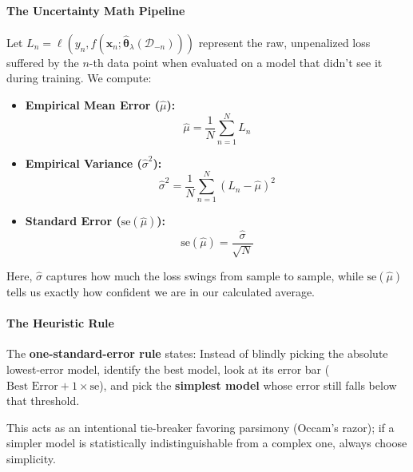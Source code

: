 \documentclass{article}
\begin{document}
\paragraph{The Uncertainty Math Pipeline}
Let $L_n = \ell(y_n, f(\mathbf{x}_n; \hat{\boldsymbol{\theta}}_\lambda(\mathcal{D}_{-n})))$ represent the raw, unpenalized loss suffered by the $n$-th data point when evaluated on a model that didn't see it during training. We compute:
\begin{itemize}
    \item \textbf{Empirical Mean Error ($\hat{\mu}$):}
    \begin{equation}
    \hat{\mu} = \frac{1}{N} \sum_{n=1}^{N} L_n
    \end{equation}
    \item \textbf{Empirical Variance ($\hat{\sigma}^2$):}
    \begin{equation}
    \hat{\sigma}^2 = \frac{1}{N} \sum_{n=1}^{N} (L_n - \hat{\mu})^2
    \end{equation}
    \item \textbf{Standard Error ($\text{se}(\hat{\mu})$):}
    \begin{equation}
    \text{se}(\hat{\mu}) = \frac{\hat{\sigma}}{\sqrt{N}}
    \end{equation}
\end{itemize}

Here, $\hat{\sigma}$ captures how much the loss swings from sample to sample, while $\text{se}(\hat{\mu})$ tells us exactly how confident we are in our calculated average.

\paragraph{The Heuristic Rule}
The \textbf{one-standard-error rule} states: Instead of blindly picking the absolute lowest-error model, identify the best model, look at its error bar ($\text{Best Error} + 1 \times \text{se}$), and pick the \textbf{simplest model} whose error still falls below that threshold. 

This acts as an intentional tie-breaker favoring parsimony (Occam's razor); if a simpler model is statistically indistinguishable from a complex one, always choose simplicity.
\end{document}
